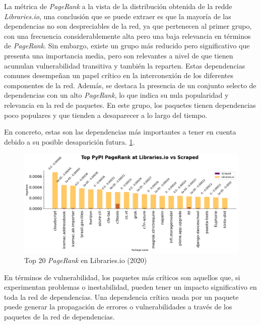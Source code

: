 La métrica de \textit{PageRank} a la vista de la distribución obtenida de la redde \textit{Libraries.io}, una conclusión
que se puede extraer es que la mayoría de las dependencias no son despreciables de la red, ya que pertenecen al primer grupo,
con una frecuencia considerablemente alta pero una baja relevancia en términos de \textit{PageRank}. Sin embargo,
existe un grupo más reducido pero significativo que presenta una importancia media, pero son relevantes a nivel de que
tienen acumulan vulnerabilidad transitiva y también la reparten. Estas dependencias comunes desempeñan un papel crítico
en la interconexión de los diferentes componentes de la red.
Además, se destaca la presencia de un conjunto selecto de dependencias con un alto \textit{PageRank}, lo que indica su nula popularidad
y relevancia en la red de paquetes. En este grupo, los paquetes tienen dependencias poco populares y que tienden a desaparecer a lo largo del tiempo.

En concreto, estas son las dependencias más importantes a tener en cuenta debido a su posible desaparición futura. \ref{fig:Top 20 pagerank en Libraries.io}.

\begin{figure}[ht!]
    \begin{center}
        \includegraphics[width=1\textwidth]{img/pypi/libio_t20_pr_comparison.png}
        \caption{Top 20 \textit{PageRank} en Libraries.io (2020)}
        \label{fig:Top 20 pagerank en Libraries.io}
    \end{center}
\end{figure}


En términos de vulnerabilidad, los paquetes más críticos son aquellos que, si experimentan problemas o inestabilidad,
pueden tener un impacto significativo en toda la red de dependencias. Una dependencia crítica usada por un paquete
puede generar la propagación de errores o vulnerabilidades a través de los paquetes de la red de dependencias.

